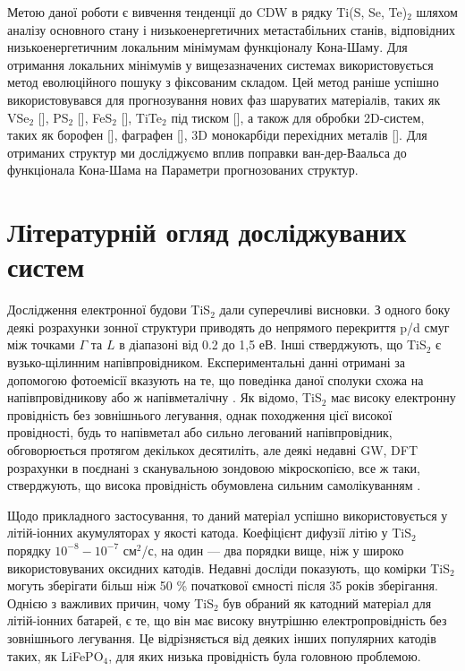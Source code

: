 Метою даної роботи є вивчення тенденції до CDW в рядку Ti(S, Se, Te)$_2$ шляхом аналізу основного стану і низькоенергетичних метастабільних станів, відповідних низькоенергетичним локальним мінімумам функціоналу Кона-Шаму. Для отримання локальних мінімумів у вищезазначених системах використовується метод еволюційного пошуку з фіксованим складом. Цей метод раніше успішно використовувався для прогнозування нових фаз шаруватих матеріалів, таких як VSe$_2$ [], PS$_2$ [], FeS$_2$ [], TiTe$_2$ під тиском [], а також для обробки 2D-систем, таких як борофен [], фаграфен [], 3D монокарбіди перехідних металів []. Для отриманих структур ми досліджуємо вплив поправки ван-дер-Ваальса до функціонала Кона-Шама на Параметри прогнозованих структур.

\section{Літературній огляд досліджуваних систем}
Дослідження електронної будови TiS$_{2}$ дали суперечливі висновки. З одного боку деякі розрахунки зонної структури приводять до непрямого перекриття p/d смуг між точками $\Gamma$ та $L$ в діапазоні від 0.2 до 1,5 еВ. Інші стверджують, що TiS$_{2}$ є вузько-щілинним напівпровідником. Експериментальні данні отримані за допомогою фотоемісії вказують на те, що поведінка даної сполуки схожа на напівпровідникову \cite{semiconducter} або ж напівметалічну \cite{semimetal}. Як відомо, TiS$_{2}$ має високу електронну провідність без зовнішнього легування, однак походження цієї високої провідності, будь то напівметал або сильно легований напівпровідник, обговорюється протягом декількох десятиліть, але деякі недавні GW, DFT розрахунки в поєднані з сканувальною зондовою мікроскопією, все ж таки, стверджують, що висока провідність обумовлена сильним самолікуванням \cite{semimetal_or_semiconducter}. 

Щодо прикладного застосування, то даний матеріал успішно використовується у літій-іонних акумуляторах у якості катода. Коефіцієнт дифузії літію у TiS$_2$ порядку $10^{-8}-10^{-7}$ см$^2$/с, на один --- два порядки вище, ніж у широко використовуваних оксидних катодів. Недавні досліди показують, що комірки TiS$_2$ могуть зберігати більш ніж 50 \% початкової ємності після 35 років зберігання. Однією з важливих причин, чому TiS$_2$ був обраний як катодний матеріал для літій-іонних батарей, є те, що він має високу внутрішню електропровідність без зовнішнього легування. Це відрізняється від деяких інших популярних катодів таких, як LiFePO$_4$, для яких низька провідність була головною проблемою.

